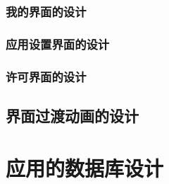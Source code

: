 \begin{figure}[h]
    \label{fig:other}
\end{figure}

\subsubsection{我的界面的设计}\label{subsubsec:me-design}


\subsubsection{应用设置界面的设计}\label{subsubsec:settings-design}


\subsubsection{许可界面的设计}\label{subsubsec:license-design}


\subsection{界面过渡动画的设计}\label{subsec:transition-design}



\section{应用的数据库设计}\label{sec:db-design}

